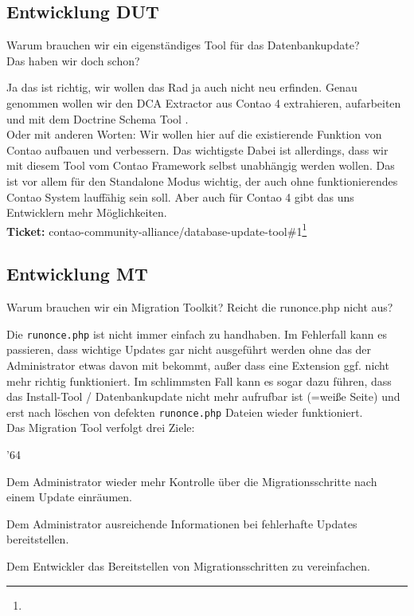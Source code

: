 \documentclass[
paper=a4,
draft=false,%
fontsize=10pt%
]{scrartcl}
\begin{document}
\subsection{Entwicklung DUT}
\label{subsec:dut}

\begin{emquotation}
Warum brauchen wir ein eigenständiges Tool für das Datenbankupdate? \\
\hspace*{\fill}Das haben wir doch schon?
\end{emquotation}

Ja das ist richtig, wir wollen das Rad ja auch nicht neu erfinden. Genau genommen wollen wir den DCA Extractor aus Contao 4 extrahieren, aufarbeiten und mit dem Doctrine Schema Tool .\\
Oder mit anderen Worten: Wir wollen hier auf die existierende Funktion von Contao aufbauen und verbessern. Das wichtigste Dabei ist allerdings, dass wir mit diesem Tool vom Contao Framework selbst unabhängig werden wollen. Das ist vor allem für den Standalone Modus wichtig, der auch ohne funktionierendes Contao System lauffähig sein soll. Aber auch für Contao 4 gibt das uns Entwicklern mehr Möglichkeiten.\\
\textbf{Ticket:} contao-community-alliance/database-update-tool\#1\footnote{}

\subsection{Entwicklung MT}

\begin{emquotation}
Warum brauchen wir ein Migration Toolkit? Reicht die runonce.php nicht aus?
\end{emquotation}

Die \texttt{runonce.php} ist nicht immer einfach zu handhaben. Im Fehlerfall kann es passieren, dass wichtige Updates gar nicht ausgeführt werden ohne das der Administrator etwas davon mit bekommt, außer dass eine Extension ggf. nicht mehr richtig funktioniert. Im schlimmsten Fall kann es sogar dazu führen, dass das Install-Tool / Datenbankupdate nicht mehr aufrufbar ist (=weiße Seite) und erst nach löschen von defekten \texttt{runonce.php} Dateien wieder funktioniert.\\
Das Migration Tool verfolgt drei Ziele:

\begin{dinglist}{'64}
\item Dem Administrator wieder mehr Kontrolle über die Migrationsschritte nach einem Update einräumen.
\item Dem Administrator ausreichende Informationen bei fehlerhafte Updates bereitstellen.
\item Dem Entwickler das Bereitstellen von Migrationsschritten zu vereinfachen.
\end{dinglist}
\end{document}
